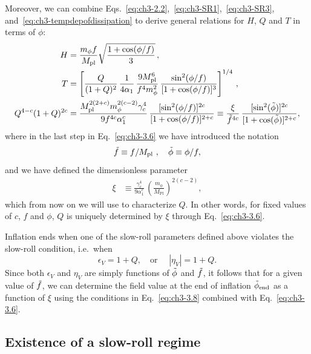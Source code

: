 Moreover, we can combine Eqs.~\ref{eq:ch3-2.2},~\ref{eq:ch3-SR1},~\ref{eq:ch3-SR3}, and~\ref{eq:ch3-tempdepofdissipation} to derive general relations for $H$, $Q$ and $T$ in terms of $\phi$:
\begin{align}
    H &= \frac{m_\phi f}{M_{\mathrm{pl}}}\sqrt{\frac{1+\cos(\phi/f)}{3}}\,, \\
    T &= \left[ \frac{Q}{(1+Q)^2}\,\frac{1}{4\alpha_1}\, \frac{9 M_{\mathrm{pl}}^6}{f^4 m_\phi^2}\,\frac{\sin^2(\phi/f)}{[1+\cos(\phi/f)]^3}\right]^{1/4}\,, \label{eq:ch3-3.5} \\
    Q^{4-c}(1+Q)^{2c} &= \frac{M_{\mathrm{pl}}^{2(2+c)}m_\phi^{2(c-2)}\gamma_c^4}{9 f^{4c} \alpha_1^c}\, \frac{[\sin^2(\phi/f)]^{2c}}{[1+\cos(\phi/f)]^{2+c}}
    \equiv \frac{\xi}{\Tilde{f}^{4c}} \, \frac{[\sin^2(\Tilde{\phi})]^{2c}}{[1+\cos(\Tilde{\phi})]^{2+c}}, \label{eq:ch3-3.6}
\end{align}
where in the last step in Eq.~\ref{eq:ch3-3.6} we have introduced the notation
\begin{equation}
\Tilde{f}\equiv f/M_{\mathrm{pl}} \,\, , \quad \Tilde{\phi}\equiv\phi/f, \label{eq:ch3-3.6.1}
\end{equation}
and we have defined the dimensionless parameter
\begin{align}
    \xi& \equiv \frac{\gamma_c^4}{9 \alpha_1^c}\,\left(\frac{m_{\phi}}{M_{\mathrm{Pl}}}\right)^{2(c-2)}, \label{eq:ch3-3.7}
\end{align}
which from now on we will use to characterize $Q$. In other words, for fixed values of $c$, $f$ and $\phi$, $Q$ is uniquely determined by $\xi$ through Eq.~\ref{eq:ch3-3.6}.

Inflation ends when one of the slow-roll parameters defined above violates the slow-roll condition, i.e.\ when
\begin{equation}
    \epsilon_V=1+Q, \quad \text{or } \quad |\eta_V|=1+Q. \label{eq:ch3-3.8}
\end{equation}
Since both $\epsilon_V$ and $\eta_V$ are simply functions of $\Tilde{\phi}$ and $\Tilde{f}$, it follows that for a given value of $\Tilde{f}$, we can determine the field value at the end of inflation $\Tilde{\phi}_{\mathrm{end}}$ as a function of $\xi$ using the conditions in Eq.~\ref{eq:ch3-3.8} combined with Eq.~\ref{eq:ch3-3.6}.

\subsection{Existence of a slow-roll regime}
\label{sec:ch3-3.1.2}

